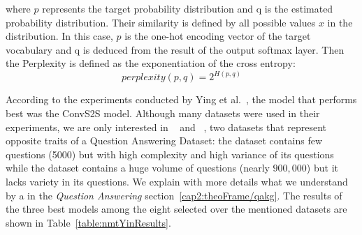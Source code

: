 \noindent where $p$ represents the target probability distribution and q is the estimated probability 
distribution. Their similarity is defined by all possible values $x$ in the distribution. In 
this case, $p$ is the one-hot encoding vector of the target vocabulary and q is deduced from 
the result of the output softmax layer. Then the Perplexity is defined as the exponentiation 
of the cross entropy:
\[
    perplexity(p,q)=2^{H(p,q)}
\]

According to the experiments conducted by Ying et al.~\cite{nmt:nl-to-sparql-Yin19}, the model 
that performs best was the ConvS2S model. Although many datasets were used in their experiments, 
we are only interested in \LCQuADone~\cite{dataset:lcquad2-DubeyBA019} and 
\DBNQA~\cite{dataset:dbnqa-hartmann-marx-soru-2018}, two datasets that represent opposite traits 
of a Question Answering Dataset: the \LCQuADone{} dataset contains few questions (5000) but with high 
complexity and high variance of its questions while the \DBNQA{} dataset contains a huge volume of 
questions (nearly $900,000$) but it lacks variety in its questions. We explain with more details 
what we understand by a  in the \textit{Question Answering} section~\ref{cap2:theoFrame/qakg}. 
The results of the three best models among the eight selected over the mentioned datasets are 
shown in Table~\ref{table:nmtYinResults}.

